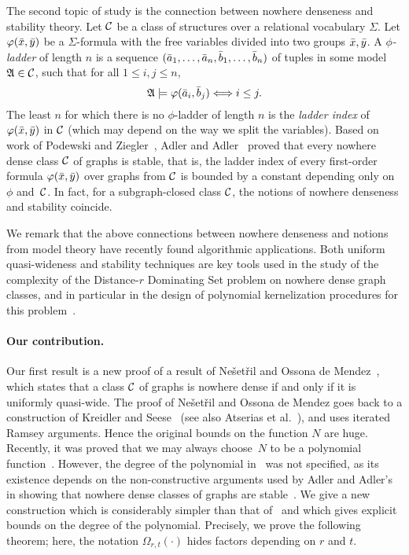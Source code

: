 The second topic of study is the
connection between nowhere denseness and stability theory. 
Let $\cal C$ be a class of structures over a relational vocabulary $\Sigma$. Let 
$\varphi(\bar{x},\bar{y})$ be a $\Sigma$-formula with the free variables
divided into two groups $\bar{x}, \bar{y}$. A \emph{$\phi$-ladder}
of length $n$ is a sequence $(\bar{a}_1,\ldots, \bar{a}_{n},
\bar{b}_1,\ldots, \bar{b}_{n})$ of tuples in some model $\mathfrak{A}\in \cal C$, 
such that for all $1\leq i,j\le n$,
\[\mathfrak{A}\models\varphi(\bar{a}_i,\bar{b}_j)\Longleftrightarrow i\leq j. \]
The least  $n$ for which 
there is no $\phi$-ladder of length $n$ is 
the \emph{ladder index} 
of $\varphi(\bar{x},\bar{y})$ in $\cal C$ (which may depend on the way we split the
variables).
Based on work of Podewski and Ziegler~\cite{podewski1978stable}, 
Adler and Adler~\cite{adler2014interpreting}
proved that every nowhere dense class $\mathcal{C}$ of graphs is stable, that is, 
the ladder index of every first-order formula $\varphi(\bar{x},\bar{y})$ over
graphs from $\mathcal{C}$ is bounded by a constant depending only on $\phi$ 
and~$\mathcal{C}$. In fact, for a subgraph-closed class $\mathcal{C}$, the notions of nowhere denseness and stability coincide.

We remark that the above connections between nowhere denseness and notions from model theory have recently found algorithmic applications.
Both uniform quasi-wideness and stability techniques are key tools used in the study of the complexity of the {\sc Distance-$r$ Dominating Set} problem on nowhere dense graph classes,
and in particular in the design of polynomial kernelization procedures for this problem~\cite{DawarK09,drange2016kernelization,eickmeyer2016neighborhood,siebertz2016polynomial}.

\paragraph{Our contribution.} 
Our first result is  a new proof of a result of
Ne\v{s}et\v{r}il and Ossona de Mendez~\cite{nevsetvril2010first},
which states that a class $\mathcal{C}$ of graphs is nowhere dense if and only if it
is uniformly quasi-wide. The proof of Ne\v{s}et\v{r}il 
and Ossona de Mendez goes back to a construction
of Kreidler and Seese~\cite{kreidler1998monadic} (see also Atserias et al.~\cite{atserias2006preservation}), 
and uses iterated Ramsey arguments. Hence the original bounds on 
the function $N$ are huge. Recently, 
it was proved that we may always choose~$N$ to be a polynomial 
function~\cite{siebertz2016polynomial}. However, the degree of the polynomial 
in~\cite{siebertz2016polynomial} was  not specified, as its existence 
depends on the non-constructive arguments used by Adler and Adler's in showing that nowhere dense classes of graphs
are stable~\cite{adler2014interpreting}. We give a new construction 
which is considerably simpler than that of~\cite{siebertz2016polynomial}
and which gives explicit bounds on the degree of the polynomial. 
Precisely, we prove the following theorem; here, the notation $\Omega_{r,t}(\cdot)$ hides factors depending on $r$ and $t$.

